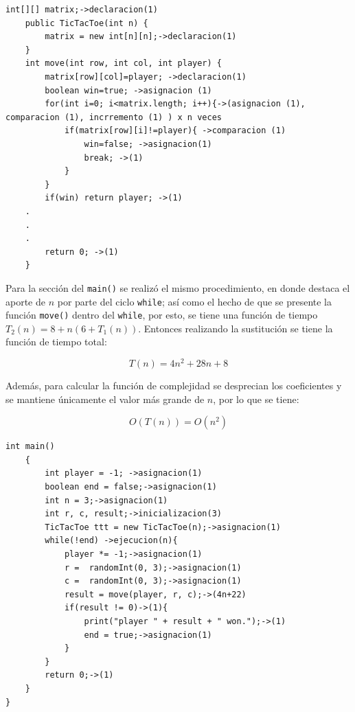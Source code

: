 \begin{verbatim}
int[][] matrix;->declaracion(1)
    public TicTacToe(int n) {
        matrix = new int[n][n];->declaracion(1)	
    }
    int move(int row, int col, int player) {				
        matrix[row][col]=player; ->declaracion(1)
        boolean win=true; ->asignacion (1)
        for(int i=0; i<matrix.length; i++){->(asignacion (1), comparacion (1), incrremento (1) ) x n veces
            if(matrix[row][i]!=player){ ->comparacion (1)
                win=false; ->asignacion(1)
                break; ->(1)
            }
        }
        if(win) return player; ->(1)
    .
    .
    .
        return 0; ->(1)
    }		
\end{verbatim}

Para la sección del \texttt{main()} se realizó el mismo procedimiento, en donde destaca el aporte de $n$ por parte del ciclo \texttt{while}; así como el hecho de que se presente la función \texttt{move()} dentro del \texttt{while}, por esto, se tiene una función de tiempo $T_2(n)=8+n(6+T_1(n))$. Entonces realizando la sustitución se tiene la función de tiempo total: 

\begin{equation*}
    T(n) = 4n^2+28n+8
\end{equation*}

Además, para calcular la función de complejidad se desprecian los coeficientes y se mantiene únicamente el valor más grande de $n$, por lo que se tiene:

\begin{equation*}
    O(T(n)) = O(n^2)
\end{equation*}

\begin{verbatim}
int main()
    {
        int player = -1; ->asignacion(1)
        boolean end = false;->asignacion(1)
        int n = 3;->asignacion(1)
        int r, c, result;->inicializacion(3)
        TicTacToe ttt = new TicTacToe(n);->asignacion(1)
        while(!end)	->ejecucion(n){
            player *= -1;->asignacion(1)
            r =  randomInt(0, 3);->asignacion(1)
            c =  randomInt(0, 3);->asignacion(1)
            result = move(player, r, c);->(4n+22)
            if(result != 0)->(1){
                print("player " + result + " won.");->(1)
                end = true;->asignacion(1)
            }
        }
        return 0;->(1)
    }
}
\end{verbatim}

